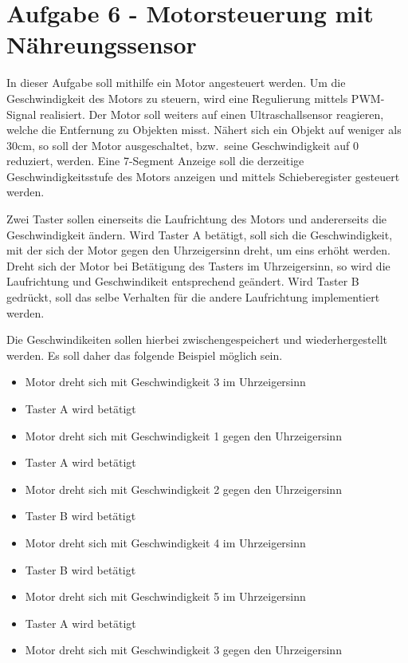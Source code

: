 \section{Aufgabe 6 - Motorsteuerung mit Nähreungssensor}
\label{sec:aufgabe-6---motorsteuerung-mit-naehreungssensor}

In dieser Aufgabe soll mithilfe ein Motor angesteuert werden.
Um die Geschwindigkeit des Motors zu steuern, wird eine Regulierung mittels PWM-Signal realisiert.
Der Motor soll weiters auf einen Ultraschallsensor reagieren, welche die Entfernung zu Objekten misst.
Nähert sich ein Objekt auf weniger als 30cm, so soll der Motor ausgeschaltet, bzw.\ seine Geschwindigkeit auf 0 reduziert, werden.
Eine 7-Segment Anzeige soll die derzeitige Geschwindigkeitsstufe des Motors anzeigen und mittels Schieberegister gesteuert werden.

Zwei Taster sollen einerseits die Laufrichtung des Motors und andererseits die Geschwindigkeit ändern.
Wird Taster A betätigt, soll sich die Geschwindigkeit, mit der sich der Motor gegen den Uhrzeigersinn dreht, um eins erhöht werden.
Dreht sich der Motor bei Betätigung des Tasters im Uhrzeigersinn, so wird die Laufrichtung und Geschwindikeit entsprechend geändert.
Wird Taster B gedrückt, soll das selbe Verhalten für die andere Laufrichtung implementiert werden.

Die Geschwindikeiten sollen hierbei zwischengespeichert und wiederhergestellt werden.
Es soll daher das folgende Beispiel möglich sein.

\begin{itemize}
    \item Motor dreht sich mit Geschwindigkeit 3 im Uhrzeigersinn
    \item Taster A wird betätigt
    \item Motor dreht sich mit Geschwindigkeit 1 gegen den Uhrzeigersinn
    \item Taster A wird betätigt
    \item Motor dreht sich mit Geschwindigkeit 2 gegen den Uhrzeigersinn
    \item Taster B wird betätigt
    \item Motor dreht sich mit Geschwindigkeit 4 im Uhrzeigersinn
    \item Taster B wird betätigt
    \item Motor dreht sich mit Geschwindigkeit 5 im Uhrzeigersinn
    \item Taster A wird betätigt
    \item Motor dreht sich mit Geschwindigkeit 3 gegen den Uhrzeigersinn
\end{itemize}

